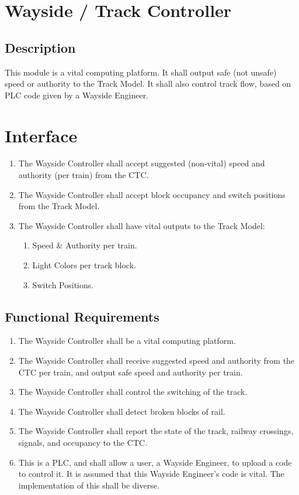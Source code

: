 \documentclass{scrreprt}
\begin{document}
\section{Wayside / Track Controller}

\subsection{Description}
This module is a vital computing platform.
It shall output safe (not unsafe) speed or authority to the Track Model.
It shall also control track flow, based on PLC code given by a Wayside Engineer.

\section{Interface}
\begin{enumerate}
    \item The Wayside Controller shall accept suggested (non-vital) speed and authority (per train) from the CTC.
    \item The Wayside Controller shall accept block occupancy and switch positions from the Track Model.
    \item The Wayside Controller shall have vital outputs to the Track Model:
        \begin{enumerate}
            \item Speed \& Authority per train.
            \item Light Colors per track block.
            \item Switch Positions.
        \end{enumerate}
\end{enumerate}
 
\subsection{Functional Requirements}
\begin{enumerate}
    \item The Wayside Controller shall be a vital computing platform.
    \item The Wayside Controller shall receive suggested speed and authority from the CTC per train, and output safe speed and authority per train.
    \item The Wayside Controller shall control the switching of the track.
    \item The Wayside Controller shall detect broken blocks of rail.
    \item The Wayside Controller shall report the state of the track, railway crossings, signals, and occupancy to the CTC.
    \item This is a PLC, and shall allow a user, a Wayside Engineer, to upload a code to control it. It is assumed that this Wayside Engineer's code is vital. The implementation of this shall be diverse.
\end{enumerate} 
\end{document}
